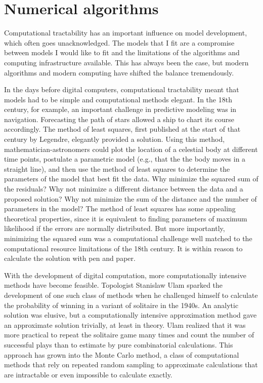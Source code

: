 \chapter{Numerical algorithms}
\label{numerical-algorithms}

Computational tractability has an important influence on model
development, which often goes unacknowledged. The models that I fit
are a compromise between models I would like to fit and the
limitations of the algorithms and computing infrastructure
available. This has always been the case, but modern algorithms and
modern computing have shifted the balance tremendously.

In the days before digital computers, computational tractability meant
that models had to be simple and computational methods elegant. In the
18th century, for example, an important challenge in predictive
modeling was in navigation.\cite{williams_sails_1993} Forecasting the
path of stars allowed a ship to chart its course accordingly. The
method of least squares, first published at the start of that century
by Legendre, elegantly provided a
solution.\cite{legendre_nouvelles_2011} Using this method,
mathematician-astronomers could plot the location of a celestial body
at different time points, postulate a parametric model (e.g.,
that the the body moves in a straight line), and then use the method
of least squares to determine the parameters of the model that best
fit the data.  Why minimize the squared sum of the residuals?  Why not
minimize a different distance between the data and a proposed
solution? Why not minimize the sum of the distance and the number of
parameters in the model? The method of least squares has some
appealing theoretical properties, since it is equivalent to finding
parameters of maximum likelihood if the errors are normally
distributed. But more importantly, minimizing the squared sum was a
computational challenge well matched to the computational resource
limitations of the 18th century.  It is within reason to calculate the
solution with pen and paper.

With the development of digital computation, more computationally
intensive methods have become feasible. Topologist Stanislaw Ulam
sparked the development of one such class of methods when he
challenged himself to calculate the probability of winning in a
variant of solitaire in the 1940s. An analytic solution was elusive,
but a computationally intensive approximation method gave an approximate
solution trivially, at least in theory. Ulam realized that it was 
more practical to repeat the solitaire game many times and count 
the number of successful plays than to estimate by pure 
combinatorial calculations.  This approach has grown into the Monte
Carlo method, a class of computational methods that rely on repeated
random sampling to approximate calculations that are intractable or
even impossible to calculate exactly.\cite{eckhardt_stan_1987}


